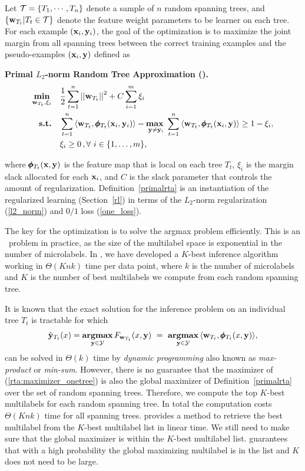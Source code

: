 {Let $\mathcal{T}=\{T_1,\cdots,T_n\}$ denote a sample of $n$ random spanning trees, and $\{\mathbf {w}_{T_t}|T_t\in\mathcal{T}\}$ denote the feature weight parameters to be learner on each tree.
For each example $(\mathbf {x}_i,\mathbf {y}_i)$, the goal of the optimization is to maximize the joint margin from all spanning trees between the correct training examples and the pseudo-examples $(\mathbf {x}_i,\mathbf {y})$ defined as
\begin{definition}{\bf Primal $L_2$-norm Random Tree Approximation (\rta).}\label{primalrta}
	\begin{align*}
		\underset{\vw_{T_t},\xi_i}{\minimize} & \quad \frac{1}{2}\sum_{t=1}^{n}\norm{\vw_{T_t}}^2 + C\sum_{i=1}^{m}\xi_i\\
		\st & \quad \sum_{t=1}^{n}{ \langle \vw_{T_t}, \phib_{T_t}(\vx_i,\vy_i) \rangle} - \underset{\vy \neq \vy_i}{\maximize\ } \sum_{t=1}^{n}{\langle \vw_{T_t}, \phib_{T_t}(\vx_i,\vy) \rangle } \geq 1 -  \xi_i, \\
		& \quad \xi_i\ge0\, , \forall\ i \in \set{1,\dots,m},
	\end{align*}
\end{definition}
\noindent
where $\pmb \phi_{T_t}(\mathbf {x},\mathbf {y})$ is the feature map that is local on each tree $T_t$, $\xi_i$ is the margin slack allocated for each $\mathbf {x}_i$, and $C$ is the slack parameter that controls the amount of regularization.
Definition~\ref{primalrta} is an instantiation of the regularized learning (Section~\ref{rl}) in terms of the $L_2$-norm regularization (\ref{l2_norm}) and $0/1$ loss (\ref{one_loss}).

The key for the optimization is to solve the argmax problem efficiently.
This is an \nphard\ problem in practice, as the size of the multilabel space is exponential in the number of microlabels.
In , we have developed a $K$-best inference algorithm working in $\Theta(Knk)$ time per data point, where $k$ is the number of microlabels and $K$ is the number of best multilabels we compute from each random spanning tree.

It is known that the exact solution for the inference problem on an individual tree $T_t$ is tractable \citep{Koller09probabilistic} for which 
\begin{align}
	\hat{\mathbf {y}}_{T_t}(x) = \underset{\mathbf {y}\in\mathcal{Y}}{\textbf{argmax}}\, F_{\mathbf {w}_{T_t}}(x,\mathbf {y})\ =\ \underset{\mathbf {y}\in\mathcal{Y}}{\textbf{argmax}}\, \langle \mathbf {w}_{T_t}, \pmb \phi_{T_t}(x,\mathbf {y})\rangle, \label{rta:maximizer_onetree}
\end{align}
can be solved in $\Theta(k)$ time by \textit{dynamic programming} also known as \textit{max-product} or \textit{min-sum}.
However, there is no guarantee that the maximizer of (\ref{rta:maximizer_onetree}) is also the global maximizer of Definition~\ref{primalrta} over the set of random spanning trees.
Therefore, we compute the top $K$-best multilabels for each random spanning tree.
In total the computation costs $\Theta(Knk)$ time for all spanning trees.
 provides a method to retrieve the best multilabel from the $K$-best multilabel list in linear time.
We still need to make sure that the global maximizer is within the $K$-best multilabel list.
 guarantees that with a high probability the global maximizing multilabel is in the list and $K$ does not need to be large.

}
